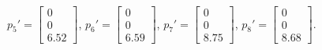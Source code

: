 \documentclass[accentcolor=tud9c,colorbacktitle,inverttitle,landscape,german,presentation,t]{tudbeamer}
\begin{document}
\begin{frame}
{	$p_5'=\begin{bmatrix}  0\\0\\6.52 \end{bmatrix}$, %
	$p_6'=\begin{bmatrix}  0\\0\\6.59 \end{bmatrix}$, %
	$p_7'=\begin{bmatrix}  0\\0\\8.75 \end{bmatrix}$, %
	$p_8'=\begin{bmatrix}  0\\0 \\8.68 \end{bmatrix}$. %
}
	
\end{frame}
\end{document}
